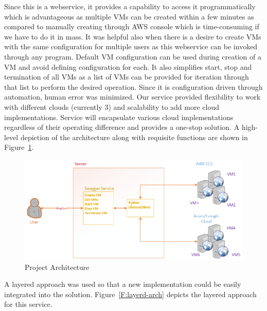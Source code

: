Since this is a webservice, it provides a capability to access it
programmatically which is advantageous as multiple VMs can be created within a
few minutes as compared to manually creating through AWS console which is
time-consuming if we have to do it in mass. It was helpful also when there is a
desire to create VMs with the same configuration for multiple users as this
webservice can be invoked through any program. Default VM configuration can be
used during creation of a VM and avoid defining configuration for each. It also
simplifies start, stop and termination of all VMs as a list of VMs can be
provided for iteration through that list to perform the desired operation. 
Since it is configuration driven through automation, human error was minimized.
Our service provided flexibility to work with different clouds (currently 3)
and
scalability to add more cloud implementations. Service will encapsulate various
cloud implementations regardless of their operating difference and provides a
one-stop solution.
A high-level depiction of the architecture along with requisite functions are shown in
Figure~\ref{F:arch}.

\begin{figure}[!ht]
  \centering
  \includegraphics[width=\columnwidth]{images/proj-arch.png}
  \caption{Project Architecture}\label{F:arch}
\end{figure}

A layered approach was used so that a new implementation could be easily integrated into
the solution. Figure~\ref{F:layerd-arch} depicts the layered approach for this service.

